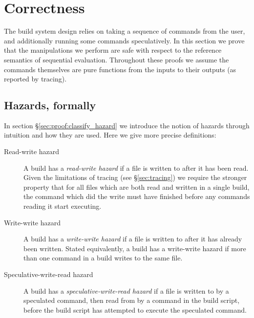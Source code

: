 
\renewcommand{\proof}{\vspace{1mm}\noindent \textbf{Proof}: }
\newcommand{\refutation}{\vspace{1mm}\noindent \textbf{Refutation}: }

\section{Correctness}
\label{sec:proof}

\newtheorem{claim}{Claim}

The build system design relies on taking a sequence of commands from the user, and additionally running some commands speculatively. In this section we prove that the manipulations we perform are safe with respect to the reference semantics of sequential evaluation. Throughout these proofs we assume the commands themselves are pure functions from the inputs to their outputs (as reported by tracing).

\subsection{Hazards, formally}
\label{sec:hazards_formally}

In section \S\ref{sec:proof:classify_hazard} we introduce the notion of hazards through intuition and how they are used. Here we give more precise definitions:

\begin{description}
\item[Read-write hazard] A build has a \emph{read-write hazard} if a file is written to after it has been read. Given the limitations of tracing (see \S\ref{sec:tracing}) we require the stronger property that for all files which are both read and written in a single build, the command which did the write must have finished before any commands reading it start executing.
\item[Write-write hazard] A build has a \emph{write-write hazard} if a file is written to after it has already been written. Stated equivalently, a build has a write-write hazard if more than one command in a build writes to the same file.
\item[Speculative-write-read hazard] A build has a \emph{speculative-write-read hazard} if a file is written to by a speculated command, then read from by a command in the build script, before the build script has attempted to execute the speculated command.
\end{description}

